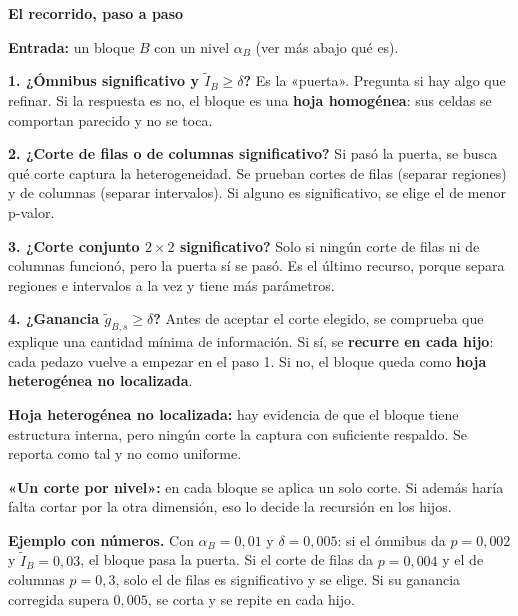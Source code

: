 \documentclass[11pt,a4paper]{article}
\newcommand{\cajainicio}[3]{\par\medskip\noindent
  \begin{lrbox}{\cajabox}\begin{minipage}{\dimexpr\linewidth-2\fboxsep-2\fboxrule\relax}%
  \textbf{\color{#1}#3}\par\smallskip}
\newcommand{\cajafin}[2]{\end{minipage}\end{lrbox}\fcolorbox{#1}{#2}{\usebox{\cajabox}}\par\medskip}
\newenvironment{nota}[1]{\cajainicio{acc}{acc!7}{#1}}{\cajafin{acc}{acc!7}}
\begin{document}
\begin{nota}{El recorrido, paso a paso}
\textbf{Entrada:} un bloque $B$ con un nivel $\alpha_B$ (ver más abajo qué es).

\textbf{1. ¿Ómnibus significativo y $\tilde I_B\ge\delta$?} Es la «puerta». Pregunta si hay algo que refinar. Si la respuesta es no, el bloque es una \textbf{hoja homogénea}: sus celdas se comportan parecido y no se toca.

\textbf{2. ¿Corte de filas o de columnas significativo?} Si pasó la puerta, se busca qué corte captura la heterogeneidad. Se prueban cortes de filas (separar regiones) y de columnas (separar intervalos). Si alguno es significativo, se elige el de menor p-valor.

\textbf{3. ¿Corte conjunto $2\times2$ significativo?} Solo si ningún corte de filas ni de columnas funcionó, pero la puerta sí se pasó. Es el último recurso, porque separa regiones e intervalos a la vez y tiene más parámetros.

\textbf{4. ¿Ganancia $\tilde g_{B,s}\ge\delta$?} Antes de aceptar el corte elegido, se comprueba que explique una cantidad mínima de información. Si sí, se \textbf{recurre en cada hijo}: cada pedazo vuelve a empezar en el paso 1. Si no, el bloque queda como \textbf{hoja heterogénea no localizada}.

\textbf{Hoja heterogénea no localizada:} hay evidencia de que el bloque tiene estructura interna, pero ningún corte la captura con suficiente respaldo. Se reporta como tal y no como uniforme.

\textbf{«Un corte por nivel»:} en cada bloque se aplica un solo corte. Si además haría falta cortar por la otra dimensión, eso lo decide la recursión en los hijos.

\textbf{Ejemplo con números.} Con $\alpha_B=0{,}01$ y $\delta=0{,}005$: si el ómnibus da $p=0{,}002$ y $\tilde I_B=0{,}03$, el bloque pasa la puerta. Si el corte de filas da $p=0{,}004$ y el de columnas $p=0{,}3$, solo el de filas es significativo y se elige. Si su ganancia corregida supera $0{,}005$, se corta y se repite en cada hijo.
\end{nota}
\end{document}
